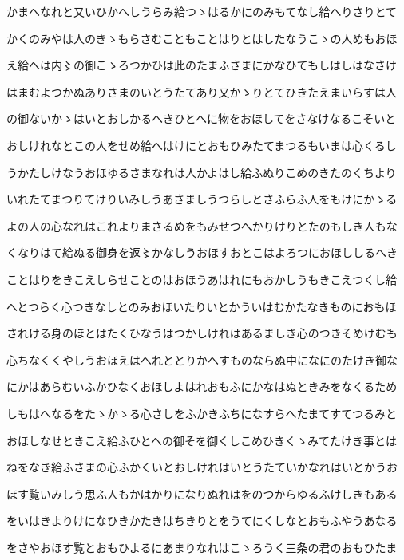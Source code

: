 \documentclass[a4paper,11pt,landscape]{ltjtarticle}
\begin{document}
\par\medskip
かまへなれと又いひかへしうらみ給つゝはるかにのみもてなし給へりさりとて
\par\medskip
かくのみやは人のきゝもらさむこともことはりとはしたなうこゝの人めもおほ
\par\medskip
え給へは内〻の御こゝろつかひは此のたまふさまにかなひてもしはしはなさけ
\par\medskip
はまむよつかぬありさまのいとうたてあり又かゝりとてひきたえまいらすは人
\par\medskip
の御ないかゝはいとおしかるへきひとへに物をおほしてをさなけなるこそいと
\par\medskip
おしけれなとこの人をせめ給へはけにとおもひみたてまつるもいまは心くるし
\par\medskip
うかたしけなうおほゆるさまなれは人かよはし給ふぬりこめのきたのくちより
\par\medskip
いれたてまつりてけりいみしうあさましうつらしとさふらふ人をもけにかゝる
\par\medskip
よの人の心なれはこれよりまさるめをもみせつへかりけりとたのもしき人もな
\par\medskip
くなりはて給ぬる御身を返〻かなしうおほすおとこはよろつにおほししるへき
\par\medskip
ことはりをきこえしらせことのはおほうあはれにもおかしうもきこえつくし給
\par\medskip
へとつらく心つきなしとのみおほいたりいとかういはむかたなきものにおもほ
\par\medskip
されける身のほとはたくひなうはつかしけれはあるましき心のつきそめけむも
\par\medskip
心ちなくくやしうおほえはへれととりかへすものならぬ中になにのたけき御な
\par\medskip
にかはあらむいふかひなくおほしよはれおもふにかなはぬときみをなくるため
\par\medskip
しもはへなるをたゝかゝる心さしをふかきふちになすらへたまてすてつるみと
\par\medskip
おほしなせときこえ給ふひとへの御そを御くしこめひきくゝみてたけき事とは
\par\medskip
ねをなき給ふさまの心ふかくいとおしけれはいとうたていかなれはいとかうお
\par\medskip
ほす覧いみしう思ふ人もかはかりになりぬれはをのつからゆるふけしきもある
\par\medskip
をいはきよりけになひきかたきはちきりとをうてにくしなとおもふやうあなる
\par\medskip
をさやおほす覧とおもひよるにあまりなれはこゝろうく三条の君のおもひたま
\end{document}
